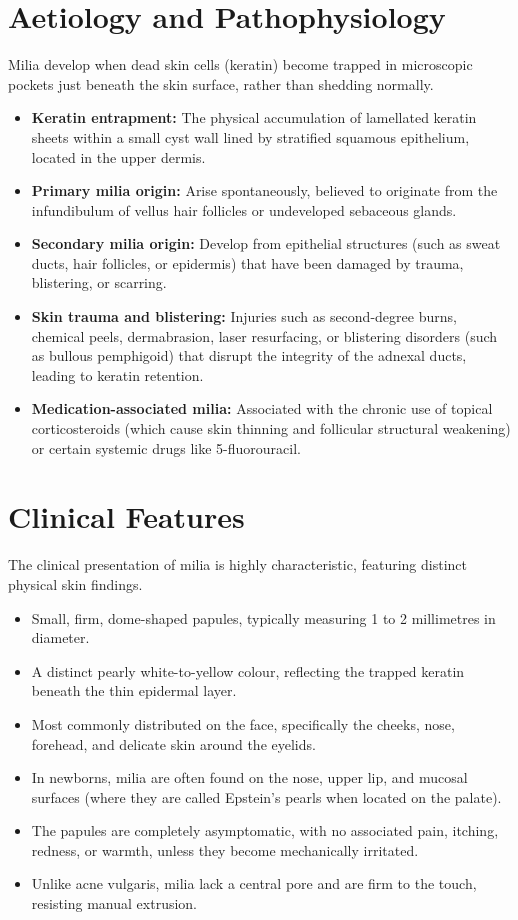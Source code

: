 \section*{Aetiology and Pathophysiology}
Milia develop when dead skin cells (keratin) become trapped in microscopic pockets just beneath the skin surface, rather than shedding normally.
\begin{itemize}
    \item \textbf{Keratin entrapment:} The physical accumulation of lamellated keratin sheets within a small cyst wall lined by stratified squamous epithelium, located in the upper dermis.
    \item \textbf{Primary milia origin:} Arise spontaneously, believed to originate from the infundibulum of vellus hair follicles or undeveloped sebaceous glands.
    \item \textbf{Secondary milia origin:} Develop from epithelial structures (such as sweat ducts, hair follicles, or epidermis) that have been damaged by trauma, blistering, or scarring.
    \item \textbf{Skin trauma and blistering:} Injuries such as second-degree burns, chemical peels, dermabrasion, laser resurfacing, or blistering disorders (such as bullous pemphigoid) that disrupt the integrity of the adnexal ducts, leading to keratin retention.
    \item \textbf{Medication-associated milia:} Associated with the chronic use of topical corticosteroids (which cause skin thinning and follicular structural weakening) or certain systemic drugs like 5-fluorouracil.
\end{itemize}

\section*{Clinical Features}
The clinical presentation of milia is highly characteristic, featuring distinct physical skin findings.
\begin{itemize}
    \item Small, firm, dome-shaped papules, typically measuring 1 to 2 millimetres in diameter.
    \item A distinct pearly white-to-yellow colour, reflecting the trapped keratin beneath the thin epidermal layer.
    \item Most commonly distributed on the face, specifically the cheeks, nose, forehead, and delicate skin around the eyelids.
    \item In newborns, milia are often found on the nose, upper lip, and mucosal surfaces (where they are called Epstein's pearls when located on the palate).
    \item The papules are completely asymptomatic, with no associated pain, itching, redness, or warmth, unless they become mechanically irritated.
    \item Unlike acne vulgaris, milia lack a central pore and are firm to the touch, resisting manual extrusion.
\end{itemize}

